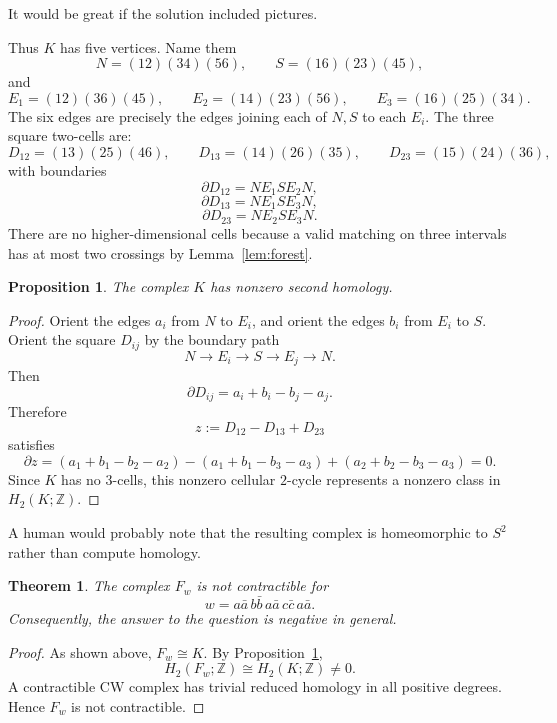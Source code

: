 \documentclass[12pt]{article}
\newtheorem{theorem}{Theorem}
\newtheorem{proposition}{Proposition}
\newcommand{\bd}{\partial}
\newcommand{\review}[1]{\begin{reviewbox}#1\end{reviewbox}}
\begin{document}
\review{It would be great if the solution included pictures.}

Thus \(K\) has five vertices.  Name them
\[
N=(12)(34)(56),\qquad S=(16)(23)(45),
\]
and
\[
E_1=(12)(36)(45),\qquad
E_2=(14)(23)(56),\qquad
E_3=(16)(25)(34).
\]
The six edges are precisely the edges joining each of \(N,S\) to each \(E_i\).  The three square two-cells are:
\[
D_{12}=(13)(25)(46),\qquad
D_{13}=(14)(26)(35),\qquad
D_{23}=(15)(24)(36),
\]
with boundaries
\[
\bd D_{12}=N E_1 S E_2 N,
\]
\[
\bd D_{13}=N E_1 S E_3 N,
\]
\[
\bd D_{23}=N E_2 S E_3 N.
\]
There are no higher-dimensional cells because a valid matching on three intervals has at most two crossings by Lemma~\ref{lem:forest}.

\begin{proposition}\label{prop:h2}
The complex \(K\) has nonzero second homology.
\end{proposition}

\begin{proof}
Orient the edges \(a_i\) from \(N\) to \(E_i\), and orient the edges \(b_i\) from \(E_i\) to \(S\).  Orient the square \(D_{ij}\) by the boundary path
\[
N\longrightarrow E_i\longrightarrow S\longrightarrow E_j\longrightarrow N.
\]
Then
\[
\partial D_{ij}=a_i+b_i-b_j-a_j.
\]
Therefore
\[
z:=D_{12}-D_{13}+D_{23}
\]
satisfies
\[
\partial z
=
(a_1+b_1-b_2-a_2)
-(a_1+b_1-b_3-a_3)
+(a_2+b_2-b_3-a_3)
=0.
\]
Since \(K\) has no \(3\)-cells, this nonzero cellular \(2\)-cycle represents a nonzero class in \(H_2(K;\mathbb Z)\).
\end{proof}

\review{A human would probably note that the resulting complex is homeomorphic to $S^2$ rather than compute homology.}

\begin{theorem}
The complex \(F_w\) is not contractible for
\[
w=a\bar a\, b\bar b\, a\bar a\, c\bar c\, a\bar a.
\]
Consequently, the answer to the question is negative in general.
\end{theorem}

\begin{proof}
As shown above, \(F_w\cong K\).  By Proposition~\ref{prop:h2},
\[
H_2(F_w;\mathbb Z)\cong H_2(K;\mathbb Z)\neq 0.
\]
A contractible CW complex has trivial reduced homology in all positive degrees.  Hence \(F_w\) is not contractible.
\end{proof}
\end{document}
